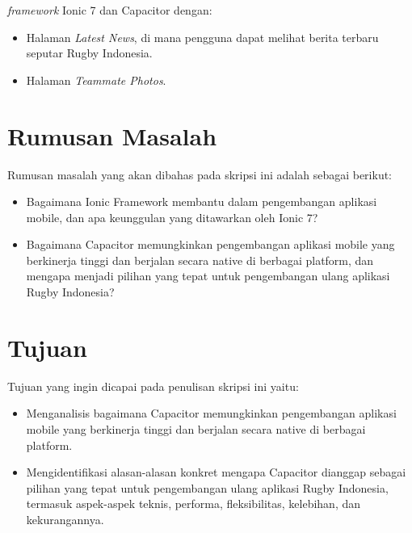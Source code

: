 \documentclass[a4paper,twoside]{article}
\begin{document}
{\it framework} Ionic 7 dan Capacitor dengan:

\begin{itemize}
    \item Halaman \textit{Latest News}, di mana pengguna dapat melihat berita terbaru seputar Rugby Indonesia.
    \item Halaman \textit{Teammate Photos}.
\end{itemize}


\section{Rumusan Masalah}
Rumusan masalah yang akan dibahas pada skripsi ini adalah sebagai berikut:
\begin{itemize}
    \item   Bagaimana Ionic Framework membantu dalam pengembangan aplikasi mobile, dan apa keunggulan yang ditawarkan oleh Ionic 7?
    \item Bagaimana Capacitor memungkinkan pengembangan aplikasi mobile yang berkinerja tinggi dan berjalan secara native di berbagai platform, dan mengapa menjadi pilihan yang tepat untuk pengembangan ulang aplikasi Rugby Indonesia?
\end{itemize}

\section{Tujuan}
Tujuan yang ingin dicapai pada penulisan skripsi ini yaitu:
\begin{itemize}
    \item Menganalisis bagaimana Capacitor memungkinkan pengembangan aplikasi mobile yang berkinerja tinggi dan berjalan secara native di berbagai platform.
    \item Mengidentifikasi alasan-alasan konkret mengapa Capacitor dianggap sebagai pilihan yang tepat untuk pengembangan ulang aplikasi Rugby Indonesia, termasuk aspek-aspek teknis, performa, fleksibilitas, kelebihan, dan kekurangannya.
\end{itemize}

\end{document}
